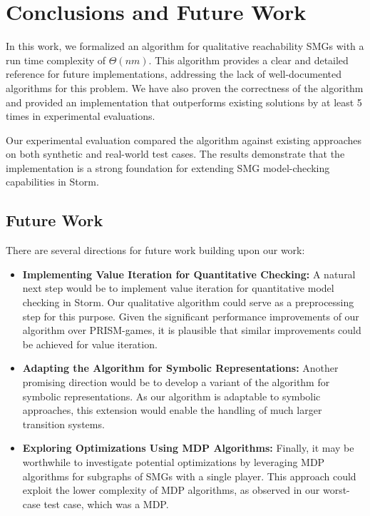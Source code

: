 \chapter{Conclusions and Future Work}
\label{chap:conc}

In this work, we formalized an algorithm for qualitative reachability SMGs with a run time complexity of \(\Theta(nm)\). This algorithm provides a clear and detailed reference for future implementations, addressing the lack of well-documented algorithms for this problem. We have also proven the correctness of the algorithm and provided an implementation that outperforms existing solutions by at least 5 times in experimental evaluations.

Our experimental evaluation compared the algorithm against existing approaches on both synthetic and real-world test cases. The results demonstrate that the implementation is a strong foundation for extending SMG model-checking capabilities in Storm.

\section{Future Work}

There are several directions for future work building upon our work:

\begin{itemize}
\item \textbf{Implementing Value Iteration for Quantitative Checking:}
   A natural next step would be to implement value iteration for quantitative model checking in Storm. Our qualitative algorithm could serve as a preprocessing step for this purpose. Given the significant performance improvements of our algorithm over PRISM-games, it is plausible that similar improvements could be achieved for value iteration.
 \item \textbf{Adapting the Algorithm for Symbolic Representations:}
   Another promising direction would be to develop a variant of the algorithm for symbolic representations. As our algorithm is adaptable to symbolic approaches, this extension would enable the handling of much larger transition systems.
  \item \textbf{Exploring Optimizations Using MDP Algorithms:}
   Finally, it may be worthwhile to investigate potential optimizations by leveraging MDP algorithms for subgraphs of SMGs with a single player. This approach could exploit the lower complexity of MDP algorithms, as observed in our worst-case test case, which was a MDP.
\end{itemize}